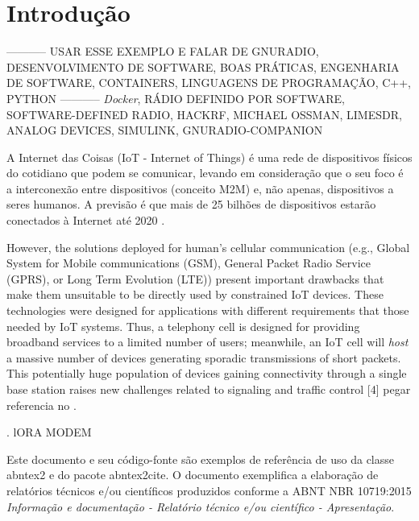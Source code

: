 \documentclass[
  12pt,				%
  openright,			%
  twoside,			%
  a4paper,			%
  english,			%
  french,				%
  spanish,			%
  brazil,				%
  ]{abntex2}
\begin{document}
\chapter*[Introdução]{Introdução}

----------- USAR ESSE EXEMPLO E FALAR DE GNURADIO, DESENVOLVIMENTO DE SOFTWARE, BOAS PRÁTICAS, ENGENHARIA DE SOFTWARE, CONTAINERS, LINGUAGENS DE PROGRAMAÇÃO, C++, PYTHON
----------- \textit{Docker}, RÁDIO DEFINIDO POR SOFTWARE, SOFTWARE-DEFINED RADIO, HACKRF, MICHAEL OSSMAN, LIMESDR, ANALOG DEVICES, SIMULINK, GNURADIO-COMPANION

A Internet das Coisas (IoT - Internet of Things) é uma rede de dispositivos físicos do cotidiano que podem se comunicar, levando em consideração que o seu foco é a interconexão entre dispositivos (conceito M2M) e, não apenas, dispositivos a seres humanos. A previsão é que mais de 25 bilhões de dispositivos estarão conectados à Internet até 2020 \cite[p. 1]{sanchez2017transmission}.

However, the solutions deployed for human’s cellular communication (e.g., Global System for Mobile communications (GSM), General Packet Radio Service (GPRS), or Long Term Evolution (LTE)) present important drawbacks that make them unsuitable to be directly used by constrained IoT devices. These technologies were designed for applications with
different requirements that those needed by IoT systems. Thus, a telephony cell is designed for providing broadband services to a limited number of users; meanwhile, an IoT cell will \textit{host} a massive number of devices generating sporadic transmissions of
short packets. This potentially huge population of devices gaining connectivity through a single base station raises new challenges related to signaling and traffic control [4] pegar referencia no \cite[p. 1]{sanchez2017transmission}.

\cite[p. 1]{AN1200.13}. lORA MODEM


Este documento e seu código-fonte são exemplos de referência de uso da classe
\textsf{abntex2} e do pacote \textsf{abntex2cite}. O documento
exemplifica a elaboração de relatórios técnicos e/ou científicos produzidos
conforme a ABNT NBR 10719:2015 \emph{Informação e documentação - Relatório
  técnico e/ou científico - Apresentação}.
\end{document}
